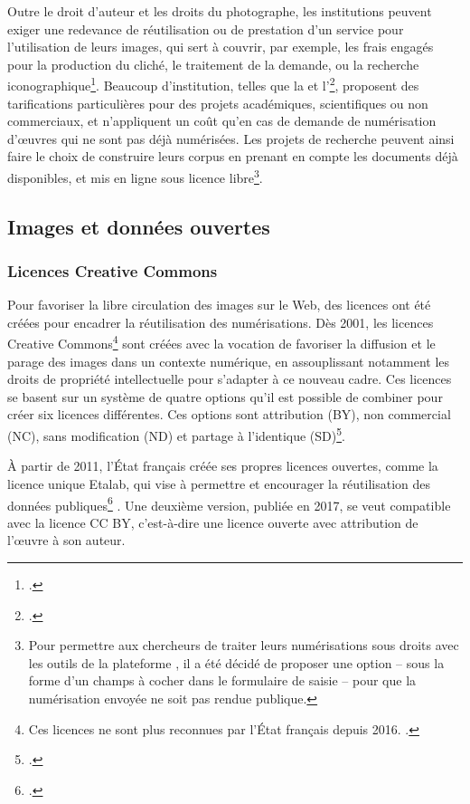 Outre le droit d'auteur et les droits du photographe, les institutions peuvent exiger une redevance de réutilisation ou de prestation d'un service pour l'utilisation de leurs images, qui sert à couvrir, par exemple, les frais engagés pour la production du cliché, le traitement de la demande, ou la recherche iconographique\footcite{GuidePratiquePour}. Beaucoup d'institution, telles que la \bnf et l'\inha\footcite{denoyelleProposCoutImages2021}, proposent des tarifications particulières pour des projets académiques, scientifiques ou non commerciaux, et n'appliquent un coût qu'en cas de demande de numérisation d'œuvres qui ne sont pas déjà numérisées. Les projets de recherche peuvent ainsi faire le choix de construire leurs corpus en prenant en compte les documents déjà disponibles, et mis en ligne sous licence libre\footnote{Pour permettre aux chercheurs de traiter leurs numérisations sous droits avec les outils de la plateforme \eida, il a été décidé de proposer une option -- sous la forme d'un champs à cocher dans le formulaire de saisie -- pour que la numérisation envoyée ne soit pas rendue publique.}.

    \subsection{Images et données ouvertes}
        \subsubsection{Licences Creative Commons}
Pour favoriser la libre circulation des images sur le Web, des licences ont été créées pour encadrer la réutilisation des numérisations. Dès 2001, les licences Creative Commons\footnote{Ces licences ne sont plus reconnues par l'État français depuis 2016. \cite{denoyelleSavoirLicenceEtalab2021}.} sont créées avec la vocation de favoriser la diffusion et le parage des images dans un contexte numérique, en assouplissant notamment les droits de propriété intellectuelle pour s'adapter à ce nouveau cadre. Ces licences se basent sur un système de quatre options qu'il est possible de combiner pour créer six licences différentes. Ces options sont attribution (BY), non commercial (NC), sans modification (ND) et partage à l’identique (SD)\footcite{GuidePratiquePour}. 

À partir de 2011, l'État français créée ses propres licences ouvertes, comme la licence unique Etalab, qui vise à \og permettre et encourager la réutilisation des données publiques\footcite{denoyelleSavoirLicenceEtalab2021} \fg. Une deuxième version, publiée en 2017, se veut compatible avec la licence CC BY, c'est-à-dire une licence ouverte avec attribution de l'œuvre à son auteur.

